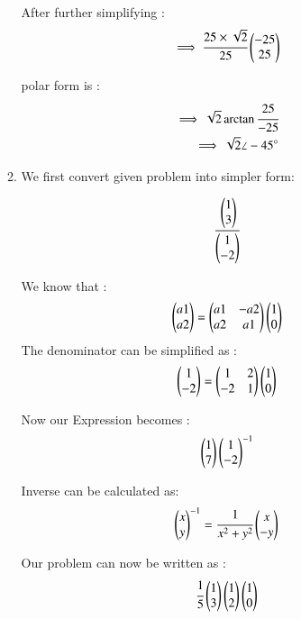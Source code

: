 \begin{enumerate}[label=\thesection.\arabic*.,ref=\thesection.\theenumi]
\begin{enumerate}
After further simplifying :
\begin{align}
    \implies \cfrac{25 \times \sqrt{2}}{25}\begin{pmatrix}-25 \\ 25\end{pmatrix}
\end{align}

polar form is :
\begin{align}
    \implies \sqrt{2}\arctan\cfrac{25}{-25}
\\
    \implies \sqrt{2} \angle -45 \degree
\end{align}



\item We first convert given problem into simpler form:

\begin{align}
    \cfrac{\begin{pmatrix}1 \\ 3\end{pmatrix}}{\begin{pmatrix}1 \\ -2\end{pmatrix}}
\end{align} 

We know that :
\begin{align}
    \begin{pmatrix}a1 \\ a2\end{pmatrix} = \begin{pmatrix}a1 & -a2\\a2 & a1\end{pmatrix}\begin{pmatrix}1 \\ 0\end{pmatrix}
\end{align}
The denominator can be simplified as :
\begin{align}
    \begin{pmatrix}1 \\ -2\end{pmatrix} = \begin{pmatrix}1 & 2\\-2 & 1\end{pmatrix}\begin{pmatrix}1 \\ 0\end{pmatrix}
\end{align}

Now our Expression becomes :
\begin{align}
    \begin{pmatrix}1 \\ 7\end{pmatrix}\begin{pmatrix}1\\-2\end{pmatrix}^{-1}
\end{align}

Inverse can be calculated as:
\begin{align}
    \begin{pmatrix}x \\ y\end{pmatrix}^{-1}=\cfrac{1}{x^2+y^2}\begin{pmatrix}x\\-y\end{pmatrix}
\end{align}

Our problem can now be written as :
\begin{align}
    \cfrac{1}{5}\begin{pmatrix}1 \\ 3\end{pmatrix}\begin{pmatrix}1\\2\end{pmatrix}\begin{pmatrix}1\\0\end{pmatrix}
\end{align}


\end{enumerate}
\end{enumerate}
